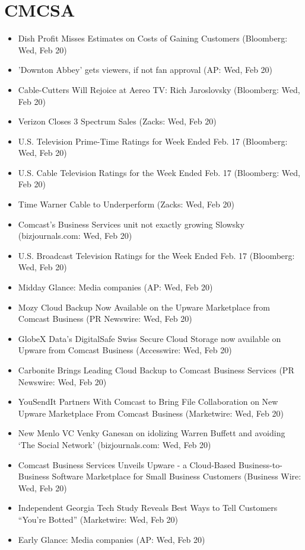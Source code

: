 \documentclass[11pt,asymmetric]{article}
\begin{document}
\section*{CMCSA}
\begin{itemize}
\item Dish Profit Misses Estimates on Costs of Gaining Customers (Bloomberg: Wed, Feb 20)
\item 'Downton Abbey' gets viewers, if not fan approval (AP: Wed, Feb 20)
\item Cable-Cutters Will Rejoice at Aereo TV: Rich Jaroslovsky (Bloomberg: Wed, Feb 20)
\item Verizon Closes 3 Spectrum Sales (Zacks: Wed, Feb 20)
\item U.S. Television Prime-Time Ratings for Week Ended Feb. 17 (Bloomberg: Wed, Feb 20)
\item U.S. Cable Television Ratings for the Week Ended Feb. 17 (Bloomberg: Wed, Feb 20)
\item Time Warner Cable to Underperform (Zacks: Wed, Feb 20)
\item Comcast’s Business Services unit not exactly growing Slowsky (bizjournals.com: Wed, Feb 20)
\item U.S. Broadcast Television Ratings for the Week Ended Feb. 17 (Bloomberg: Wed, Feb 20)
\item Midday Glance: Media companies (AP: Wed, Feb 20)
\item Mozy Cloud Backup Now Available on the Upware Marketplace from Comcast Business (PR Newswire: Wed, Feb 20)
\item GlobeX Data's DigitalSafe Swiss Secure Cloud Storage now available on Upware from Comcast Business (Accesswire: Wed, Feb 20)
\item Carbonite Brings Leading Cloud Backup to Comcast Business Services (PR Newswire: Wed, Feb 20)
\item YouSendIt Partners With Comcast to Bring File Collaboration on New Upware Marketplace From Comcast Business (Marketwire: Wed, Feb 20)
\item New Menlo VC Venky Ganesan on idolizing Warren Buffett and avoiding `The Social Network' (bizjournals.com: Wed, Feb 20)
\item Comcast Business Services Unveils Upware - a Cloud-Based Business-to-Business Software Marketplace for Small Business Customers (Business Wire: Wed, Feb 20)
\item Independent Georgia Tech Study Reveals Best Ways to Tell Customers ``You're Botted'' (Marketwire: Wed, Feb 20)
\item Early Glance: Media companies (AP: Wed, Feb 20)

\end{itemize}
\end{document}
